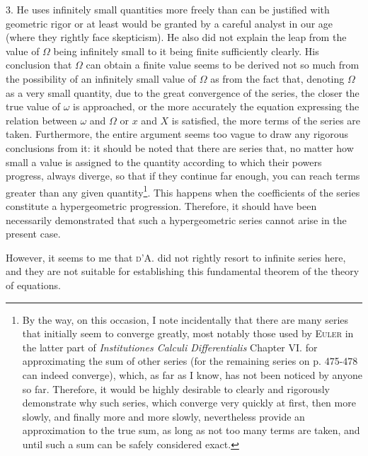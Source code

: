 \documentclass[12pt]{memoir}
\theoremstyle{plain}
\theoremstyle{remark}
\begin{document}
3. He uses infinitely small quantities more freely than can be justified with geometric rigor or at least would be granted by a careful analyst in our age (where they rightly face skepticism). He also did not explain the leap from the value of \(\Omega\) being infinitely small to it being finite sufficiently clearly. His conclusion that \(\Omega\) can obtain a finite value seems to be derived not so much from the possibility of an infinitely small value of \(\Omega\) as from the fact that, denoting \(\Omega\) as a very small quantity, due to the great convergence of the series, the closer the true value of \(\omega\) is approached, or the more accurately the equation expressing the relation between \(\omega\) and \(\Omega\) or \(x\) and \(X\) is satisfied, the more terms of the series are taken. Furthermore, the entire argument seems too vague to draw any rigorous conclusions from it: it should be noted that there are series that, no matter how small a value is assigned to the quantity according to which their powers progress, always diverge, so that if they continue far enough, you can reach terms greater than any given quantity\footnote{By the way, on this occasion, I note incidentally that there are many series that initially seem to converge greatly, most notably those used by \textsc{Euler} in the latter part of \textit{Institutiones Calculi Differentialis} Chapter VI. for approximating the sum of other series (for the remaining series on p. 475-478 can indeed converge), which, as far as I know, has not been noticed by anyone so far. Therefore, it would be highly desirable to clearly and rigorously demonstrate why such series, which converge very quickly at first, then more slowly, and finally more and more slowly, nevertheless provide an approximation to the true sum, as long as not too many terms are taken, and until such a sum can be safely considered exact.}. This happens when the coefficients of the series constitute a hypergeometric progression. Therefore, it should have been necessarily demonstrated that such a hypergeometric series cannot arise in the present case.

However, it seems to me that \textsc{d'A.} did not rightly resort to infinite series here, and they are not suitable for establishing this fundamental theorem of the theory of equations.
\end{document}
